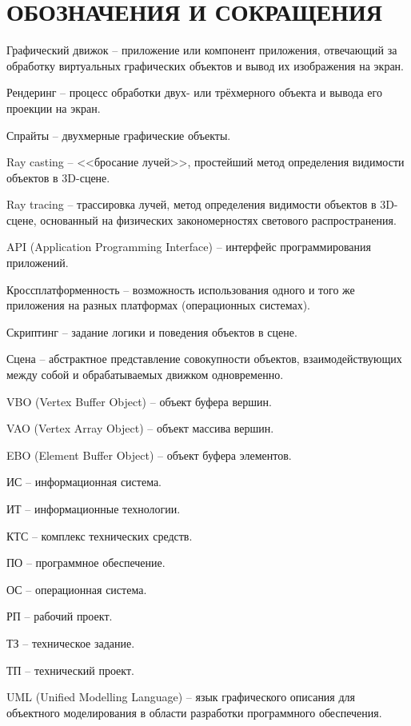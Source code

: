 \section*{ОБОЗНАЧЕНИЯ И СОКРАЩЕНИЯ}

Графический движок -- приложение или компонент приложения, отвечающий за обработку виртуальных графических объектов и вывод их изображения на экран.

Рендеринг -- процесс обработки двух- или трёхмерного объекта и вывода его проекции на экран.

Спрайты -- двухмерные графические объекты.

Ray casting -- <<бросание лучей>>, простейший метод определения видимости объектов в 3D-сцене.

Ray tracing -- трассировка лучей, метод определения видимости объектов в 3D-сцене, основанный на физических закономерностях светового распространения.

API (Application Programming Interface) -- интерфейс программирования приложений.

Кроссплатформенность -- возможность использования одного и того же приложения на разных платформах (операционных системах).

Скриптинг -- задание логики и поведения объектов в сцене.

Сцена -- абстрактное представление совокупности объектов, взаимодействующих между собой и обрабатываемых движком одновременно.

VBO (Vertex Buffer Object) -- объект буфера вершин.

VAO (Vertex Array Object) -- объект массива вершин.

EBO (Element Buffer Object) -- объект буфера элементов.

ИС -- информационная система.

ИТ -- информационные технологии.

КТС -- комплекс технических средств.

ПО -- программное обеспечение.

ОС -- операционная система.

РП -- рабочий проект.

ТЗ -- техническое задание.

ТП -- технический проект.

UML (Unified Modelling Language) -- язык графического описания для объектного моделирования в области разработки программного обеспечения.
